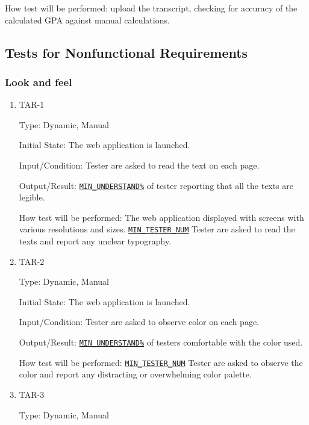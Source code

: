 \documentclass[12pt, titlepage]{article}
\begin{document}
\begin{enumerate}
How test will be performed: upload the transcript, checking for accuracy of the calculated GPA against manual calculations.


\subsection{Tests for Nonfunctional Requirements}

\subsubsection{Look and feel}
		

\begin{enumerate}

\item{TAR-1\\}\label{TAR-1}

Type: Dynamic, Manual
					
Initial State: The web application is launched.
					
Input/Condition: Tester are asked to read the text on each page.
					
Output/Result:  \hyperref[MIN_UNDERSTAND]{\texttt{MIN\_UNDERSTAND\%}} of tester reporting that all the texts are legible.
					
How test will be performed: The web application displayed with screens with various resolutions and sizes. \hyperref[MIN_TESTER_NUM]{\texttt{MIN\_TESTER\_NUM}} Tester are asked to read the texts and report any unclear typography.
					
\item{TAR-2\\}\label{TAR-2}

Type: Dynamic, Manual
					
Initial State: The web application is launched.
					
Input/Condition: Tester are asked to observe color on each page.
					
Output/Result: \hyperref[MIN_UNDERSTAND]{\texttt{MIN\_UNDERSTAND\%}} of testers comfortable with the color used.
					
How test will be performed: \hyperref[MIN_TESTER_NUM]{\texttt{MIN\_TESTER\_NUM}} Tester are asked to observe the color and report any distracting or overwhelming color palette.

\item{TAR-3\\}\label{TAR-3}

Type: Dynamic, Manual
					

\end{enumerate}
\end{enumerate}
\end{document}
